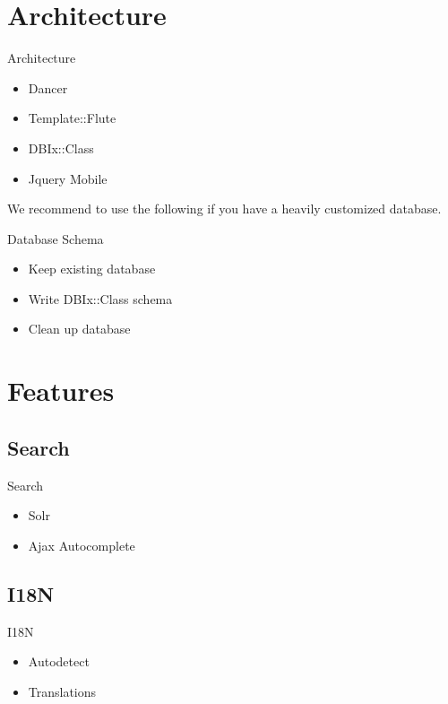 \section{Architecture}
\begin{frame}{Architecture}
\begin{itemize}
\item Dancer
\item Template::Flute
\item DBIx::Class
\item Jquery Mobile
\end{itemize}
\end{frame}

We recommend to use the following if you have a heavily customized
database.

\begin{frame}{Database Schema}
\begin{itemize}
\item Keep existing database
\item Write DBIx::Class schema
\item Clean up database
\end{itemize}
\end{frame}

\section{Features}


\subsection{Search}
\begin{frame}{Search}
\begin{itemize}
\item Solr
\item Ajax Autocomplete
\end{itemize}
\end{frame}

\subsection{I18N}
\begin{frame}{I18N}
\begin{itemize}
\item Autodetect
\item Translations
\end{itemize}
\end{frame}

